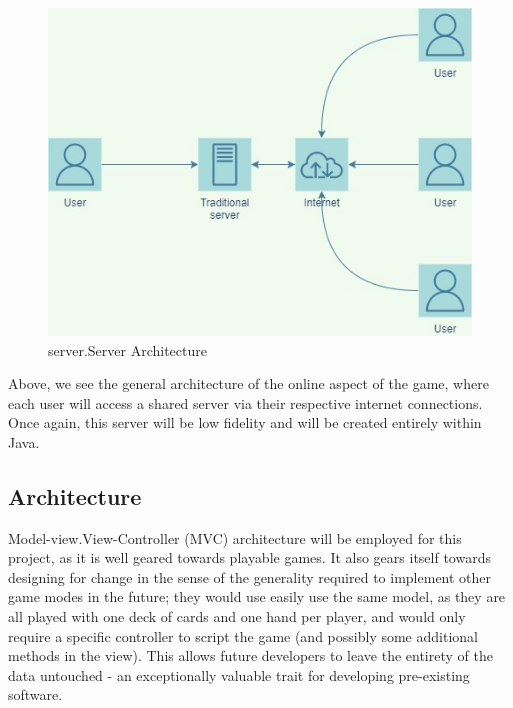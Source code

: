 \documentclass[12pt, titlepage]{article}
\begin{document}
    \begin{figure}
        \includegraphics[width=14cm]{implementation_environment (1).jpg}
        \caption{server.Server Architecture}
    \end{figure}

\bigskip

Above, we see the general architecture of the online aspect of the game, where each user will access a shared server via their respective internet connections. Once again, this server will be low fidelity and will be created entirely within Java. 

\subsection{Architecture}

Model-view.View-Controller (MVC) architecture will be employed for this project, as it is well geared towards playable games. It also gears itself towards designing for change in the sense of the generality required to implement other game modes in the future; they would use easily use the same model, as they are all played with one deck of cards and one hand per player, and would only require a specific controller to script the game (and possibly some additional methods in the view). This allows future developers to leave the entirety of the data untouched - an exceptionally valuable trait for developing pre-existing software.
\end{document}
